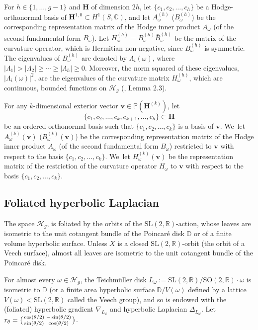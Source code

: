 \documentclass[10pt]{amsart}
\newenvironment{smallpmatrix}{\big(\begin{smallmatrix}}{\end{smallmatrix}\big)}
\theoremstyle{plain}
\theoremstyle{definition}
\numberwithin{equation}{subsection}
\newcommand\bC{\mathbb{C}}\let\C\bC
\newcommand\bD{\mathbb{D}}
\newcommand\bP{\mathbb{P}}
\newcommand\bR{\mathbb{R}}\let\R\bR
\newcommand\cH{\mathcal{H}}
\newcommand{\SL}{\mathrm{SL}}
\newcommand{\SO}{\mathrm{SO}}
\let\gradient\nabla
\let\laplacian\Delta
\newcommand{\bfH}{\boldsymbol{H}}
\newcommand{\bfv}{\boldsymbol{v}}
\newcommand{\defeq}{:=}
\newcommand{\Tm}{Teichmüller\xspace}
\begin{document}
For $h\in \{1,\dots, g-1\}$ and $\bfH$ of dimension $2h$, let $\{c_1, c_2,\ldots,c_{h}\}$ be a Hodge-orthonormal basis of $\bfH^{1,0} \subset H^1(S, \bC)$, and let $A^{(h)}_\omega$ (\resp $B^{(h)}_\omega$) be the corresponding representation matrix of the Hodge inner product $A_\omega$ (\resp of the second fundamental form $B_\omega$). Let $H^{(h)}_\omega = B^{(h)}_\omega \bar B^{(h)}_\omega$ be the matrix of the curvature operator, which is Hermitian non-negative, since $B^{(h)}_\omega$ is symmetric. The eigenvalues of $B^{(h)}_\omega$ are denoted by $\Lambda_i(\omega)$, where $ |\Lambda_1| > |\Lambda_2| \geq \cdots \geq |\Lambda_h| \geq 0$. Moreover, the norm squared of these eigenvalues, $|\Lambda_i(\omega)|^ 2$, are the eigenvalues of the curvature matrix $H^{(h)}_\omega$, which are continuous, bounded functions on $\cH_g$ (\cf \cite{FMZ12}, Lemma 2.3).

For any $k$-dimensional exterior vector $\bfv \in \bP(\bfH^{(k)})$, let
\[
\{c_1, c_2,\ldots, c_k, c_{k+1}, \ldots, c_{h}\} \subset
\bfH
\]
be an ordered orthonormal basis such that
$\{c_1, c_2,\ldots, c_k\}$ is a basis of $\bfv$. We~let $A^{(k)}_\omega(\bfv)$ (\resp $B^{(k)}_\omega(\bfv)$) be the corresponding representation matrix of the Hodge inner product $A_\omega$ (\resp of the second fundamental form $B_\omega$)
restricted to $\bfv$ with respect to the basis
$\{c_1, c_2,\ldots, c_k\}$. We~let $H^{(k)}_\omega (\bfv)$
be the representation matrix of the restriction of the curvature operator $H_\omega$ to $\bfv$ with respect to the basis $\{c_1, c_2,\ldots, c_k\}$.

\subsection{Foliated hyperbolic Laplacian}
The space $\cH_g$, is foliated by the orbits of the $\SL(2,\bR)$-action, whose leaves are isometric to the unit cotangent bundle of the Poincaré disk $\bD$ or of a finite volume hyperbolic surface. Unless $X$ is a closed $\SL(2,\R)$-orbit (the orbit of a Veech surface), almost all leaves are isometric to the unit cotangent bundle of the Poincaré disk.

For almost every $\omega \in \cH_g$, the \Tm disk $L_\omega \defeq \SL(2,\bR)/\SO(2,\bR) \cdot \omega$ is isometric to $\bD$ (or a finite area hyperbolic surface $\bD/ V(\omega)$ defined by a lattice $V(\omega)<\SL(2,\R)$ called the Veech group), and so is endowed with the (foliated) hyperbolic gradient $\gradient_{L_\omega}$ and hyperbolic Laplacian $\laplacian_{L_\omega}$. Let $ r_\theta=\begin{smallpmatrix} \cos(\theta/2) &-\sin(\theta/2)\\ \sin(\theta/2)& \cos(\theta/2) \end{smallpmatrix}$.
\end{document}
